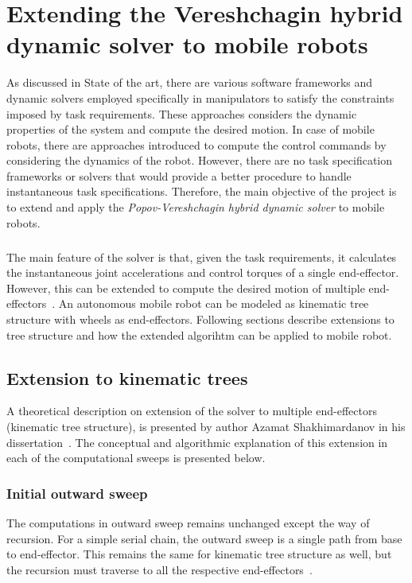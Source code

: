 
\chapter{Extending the Vereshchagin hybrid dynamic solver to mobile robots}\label{chap:extension}

As discussed in State of the art, there are various software frameworks and dynamic solvers employed specifically in manipulators to satisfy the constraints imposed by task requirements. These approaches considers the dynamic properties of the system and compute the desired motion. In case of mobile robots, there are approaches introduced to compute the control commands by considering the dynamics of the robot. However, there are no task specification frameworks or solvers that would provide a better procedure to handle instantaneous task specifications. Therefore, the main objective of the project is to 
extend and apply the \textit{Popov-Vereshchagin hybrid dynamic solver} to mobile robots. 


\paragraph{}The main feature of the solver is that, given the task requirements, it calculates the instantaneous joint accelerations and control torques of a single end-effector. However, this can be extended to compute the desired motion of multiple end-effectors~\cite{shakhimardanov2015composable}. An autonomous mobile robot can be modeled as kinematic tree structure with wheels as end-effectors. Following sections describe extensions to tree structure and how the extended algorihtm can be applied to mobile robot.


\section{Extension to kinematic trees}

A theoretical description on extension of the solver to multiple end-effectors (kinematic tree structure), is presented by author Azamat Shakhimardanov in his dissertation~\cite{shakhimardanov2015composable}. The  conceptual and algorithmic explanation of this extension in each of the computational sweeps is presented below.

\subsection{Initial outward sweep}
The computations in outward sweep remains unchanged except the way of recursion. For a simple serial chain, the outward sweep is a single path from base to end-effector. This remains the same for kinematic tree structure as well, but the recursion must traverse to all the respective end-effectors~\cite{shakhimardanov2015composable}. 

